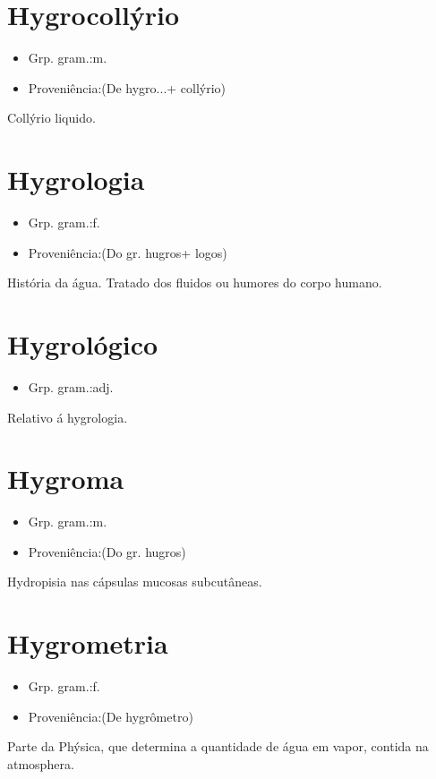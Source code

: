\documentclass{article}
\begin{document}
\section{Hygrocollýrio}
\begin{itemize}
\item {Grp. gram.:m.}
\end{itemize}
\begin{itemize}
\item {Proveniência:(De \textunderscore hygro...\textunderscore  + \textunderscore collýrio\textunderscore )}
\end{itemize}
Collýrio liquido.
\section{Hygrologia}
\begin{itemize}
\item {Grp. gram.:f.}
\end{itemize}
\begin{itemize}
\item {Proveniência:(Do gr. \textunderscore hugros\textunderscore  + \textunderscore logos\textunderscore )}
\end{itemize}
História da água.
Tratado dos fluidos ou humores do corpo humano.
\section{Hygrológico}
\begin{itemize}
\item {Grp. gram.:adj.}
\end{itemize}
Relativo á hygrologia.
\section{Hygroma}
\begin{itemize}
\item {Grp. gram.:m.}
\end{itemize}
\begin{itemize}
\item {Proveniência:(Do gr. \textunderscore hugros\textunderscore )}
\end{itemize}
Hydropisia nas cápsulas mucosas subcutâneas.
\section{Hygrometria}
\begin{itemize}
\item {Grp. gram.:f.}
\end{itemize}
\begin{itemize}
\item {Proveniência:(De \textunderscore hygrômetro\textunderscore )}
\end{itemize}
Parte da Phýsica, que determina a quantidade de água em vapor, contida na atmosphera.
\end{document}
